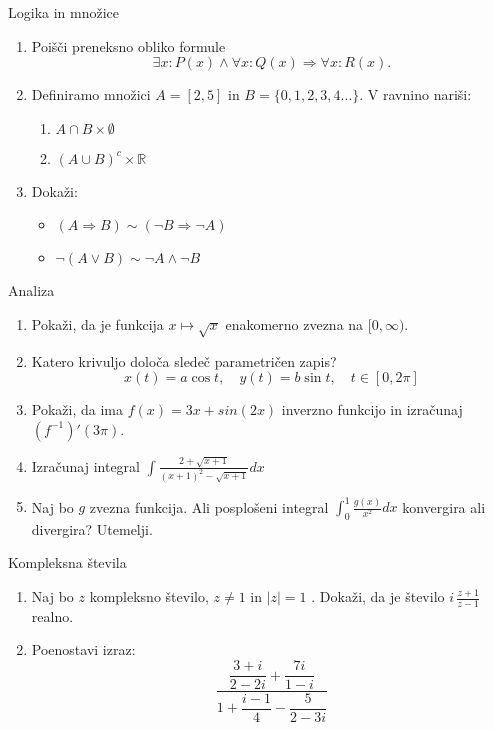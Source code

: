 \begin{frame}{Logika in množice}
	\begin{enumerate}
		\item
		Poišči preneksno obliko formule $$\exists x : P(x) \land \forall x: Q(x) \Rightarrow  \forall x : R(x).$$
		\item 
		Definiramo množici $A = [2,5]$ in $B = \{0,1,2,3,4...\}$.
		V ravnino nariši:
		\begin{enumerate}
		   \item $A \cap B \times \emptyset$ 
		   \item $(A \cup B)^c \times \mathbb{R} $
		\end{enumerate}
		\item
		Dokaži:
		\begin{itemize}
			\item $(A \Rightarrow B) \sim (\lnot B \Rightarrow \lnot A)$
			\item $\lnot(A \lor B) \sim \lnot A \land \lnot B $
		\end{itemize}
	\end{enumerate}
\end{frame}

\begin{frame}{Analiza}
	\begin{enumerate}
		\item
		Pokaži, da je funkcija $x \mapsto \sqrt{x} $ enakomerno zvezna na $ [0,\infty ) $.
		\item 
		Katero krivuljo določa sledeč parametričen zapis?
		$$
		   x(t) = a \cos t, \quad %
		   y(t) = b \sin t, \quad  %
		   t \in [0, 2 \pi]
		$$ 
		\item
		Pokaži, da ima $f(x) = 3x + sin(2x)$ inverzno funkcijo in izračunaj $(f^{-1})'(3\pi)$.
		
		\item
		Izračunaj integral 
		$\displaystyle \int \frac{2+\sqrt{x+1}}{(x+1)^2-\sqrt{x+1}} dx$
		\item 
		Naj bo $g$ zvezna funkcija. Ali posplošeni integral 
		$\int_{0}^{1} \frac{g(x)}{x^2} dx$
		konvergira ali divergira? Utemelji.
	\end{enumerate}
\end{frame}

\begin{frame}{Kompleksna števila}
	\begin{enumerate}
		\item
		Naj bo $z$ kompleksno število, $z \ne 1$ in $ |z| = 1$ .
		Dokaži, da je število \( i \, \frac{z+1}{z-1} \) realno.
		\item
		Poenostavi izraz:
		$$ \frac {\dfrac{3+i}{2-2i} + \dfrac{7i}{1-i}}{1+ \dfrac{i-1}{4}- \dfrac{5}{2-3i}}$$
	\end{enumerate}
\end{frame}